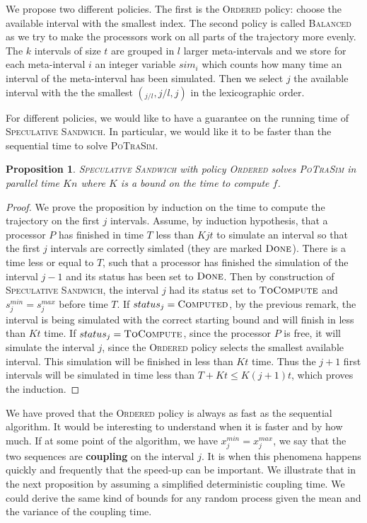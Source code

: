 \documentclass[a4paper,10pt]{article}
\newtheorem{proposition}{Proposition}
\begin{document}
We propose two different policies. 
The first is the \textsc{Ordered} policy: choose the available interval with the smallest index. 
The second policy is called \textsc{Balanced} as we try to make the processors work on all parts of the trajectory more evenly. The $k$ intervals of size $t$ are grouped in $l$ larger meta-intervals and we store for each meta-interval $i$ an integer variable $sim_i$ which counts how many time an interval of the meta-interval has been simulated.
 Then we select $j$ the available interval with the the smallest $(_{j/l},j/l,j)$ in the lexicographic order. 

For different policies, we would like to have a guarantee on the running time of  \textsc{Speculative Sandwich}. In particular, we would like it to be faster than the sequential time to solve \textsc{PoTraSim}.

\begin{proposition}
 \textsc{Speculative Sandwich} with policy \textsc{Ordered} solves \textsc{PoTraSim} in parallel time $Kn$ where $K$ is a bound on the time to compute $f$.
\end{proposition}
\begin{proof}
We prove the proposition by induction on the time to compute the trajectory on the first $j$ intervals. 
Assume, by induction hypothesis, that a processor $P$ has finished in time $T$ less than $Kjt$ to simulate an interval so that the first $j$ intervals are correctly simlated (they are marked $\textsc{Done}$). There is a time less or equal to $T$, such that a processor has finished the simulation of the interval $j-1$ and its status has been set to $\textsc{Done}$. Then by construction of \textsc{Speculative Sandwich}, the interval $j$ had its status set to $\textsc{ToCompute}$ and $s_j^{min} = s_j^{max}$ before time $T$.
If $status_j =  \textsc{Computed}$, by the previous remark, the interval is being 
simulated with the correct starting bound and will finish in less than $Kt$ time.
If $status_j =  \textsc{ToCompute}$, since the processor $P$ is free, it will simulate the interval $j$, since the \textsc{Ordered} policy selects the smallest available interval. This simulation will be finished in less than $Kt$ time. Thus the $j+1$ first intervals will be simulated in time less than $T + Kt \leq K(j+1)t$, which proves the induction.
\end{proof}

We have proved that the \textsc{Ordered} policy is always as fast as the sequential algorithm.
It would be interesting to understand when it is faster and by how much. 
If at some point of the algorithm, we have  $x_j^{min} = x_j^{max}$, we say that the 
two sequences are \textbf{coupling} on the interval $j$. It is when this phenomena happens quickly and frequently that the speed-up can be important. We illustrate that in the next proposition by assuming a simplified deterministic coupling time.
We could derive the same kind of bounds for any random process given the mean and the variance of the coupling time.
\end{document}
